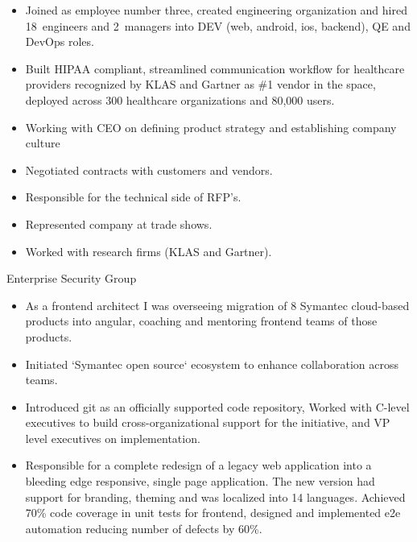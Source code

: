 \documentclass[11pt,a4paper,roman]{moderncv}       %
\begin{document}

\begin{itemize}
    \item Joined as employee number three, created engineering organization and hired 18~engineers and 2~managers into DEV (web, android, ios, backend), QE and DevOps roles. 
    \item Built HIPAA compliant, streamlined communication workflow for healthcare providers recognized by KLAS and Gartner as \#1 vendor in the space, deployed across 300 healthcare organizations and 80,000 users.
    \item Working with CEO on defining product strategy and establishing company culture 
    \item Negotiated contracts with customers and vendors.
    \item Responsible for the technical side of RFP's.
    \item Represented company at trade shows.
    \item Worked with research firms (KLAS and Gartner).
\end{itemize}

\bigskip
\pagebreak


Enterprise Security Group
\begin{itemize}
    \item As a frontend architect I was overseeing migration of 8 Symantec cloud-based products into angular, coaching and mentoring frontend teams of those products. 
    \item Initiated `Symantec open source` ecosystem to enhance collaboration across teams. 
    \item Introduced git as an officially supported code repository, Worked with C-level executives to build cross-organizational support for the initiative, and VP level executives on implementation.
    \item Responsible for a complete redesign of a legacy web application into a bleeding edge responsive, single page application. The new version had support for branding, theming and was localized into 14 languages. Achieved 70\% code coverage in unit tests for frontend, designed and implemented e2e automation reducing number of defects by 60\%.
\end{itemize}
\end{document}
